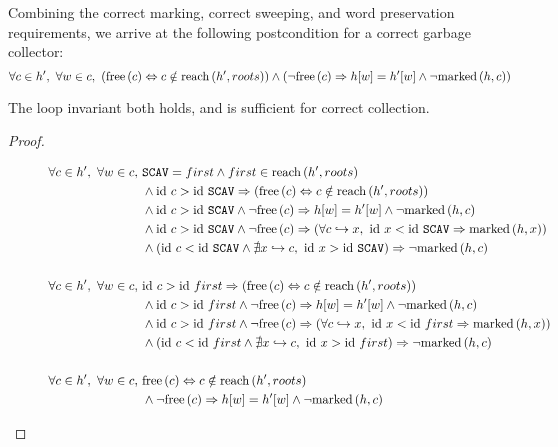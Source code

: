 Combining the correct marking, correct sweeping, and word preservation
requirements, we arrive at the following postcondition for a correct
garbage collector: \[\forall c \in h',\ \forall w \in c,\
(\mathrm{free}\left(c\right) \Leftrightarrow c \notin \mathrm{reach}\left(h', roots\right)) \land (\lnot\mathrm{free}\left(c\right) \Rightarrow
h[w] = h'[w] \land \lnot\mathrm{marked}\left(h, c\right))\]

\begin{theorem}
  \label{thm:ms-part}
  The loop invariant both holds, and is sufficient for correct
  collection.
\end{theorem}

\begin{proof}
  \begin{figure}[t]
    \centering
    \begin{align*}
      \forall c \in h',\ \forall w \in c,\ &\mathtt{SCAV} = first \land
        first \in \reach{h'}{roots}\\
%
      &\land \id~c > \id~\mathtt{SCAV} \implies (\free{c}
        \iff c \notin \reach{h'}{roots})\\
%
      &\land \id~c > \id~\mathtt{SCAV} \land \lnot\free{c}
        \implies h[w] = h'[w] \land \lnot \marked{h}{c}\\
%
      &\land \id~c > \id~\mathtt{SCAV} \land \lnot\free{c}
        \implies (\forall c \pointsto x,\ \id~x < \id~\mathtt{SCAV}
        \implies \marked{h}{x})\\
%
      &\land \left(\id~c < \id~\mathtt{SCAV} \land \nexists x \pointsto
        c,\ \id~x > \id~\mathtt{SCAV}\right) \implies
        \lnot\marked{h}{c}\\\\
%
%
      \forall c \in h',\ \forall w \in c,\ & \id~c > \id~first \implies
        (\free{c} \iff c \notin \reach{h'}{roots})\\
%
      &\land \id~c > \id~first \land \lnot\free{c}
        \implies h[w] = h'[w] \land \lnot \marked{h}{c}\\
%
      &\land \id~c > \id~first \land \lnot\free{c}
        \implies (\forall c \pointsto x,\ \id~x < \id~first
        \implies \marked{h}{x})\\
%
      &\land \left(\id~c < \id~first \land \nexists x \pointsto
        c,\ \id~x > \id~first\right) \implies
        \lnot\marked{h}{c}\\\\
%
%
      \forall c \in h',\ \forall w \in c,\ & \free{c} \iff c \notin
        \reach{h'}{roots}\\
%
      &\land \lnot\free{c} \implies h[w] = h'[w] \land \lnot \marked{h}{c}\\

\end{align*}
\end{figure}
\end{proof}

